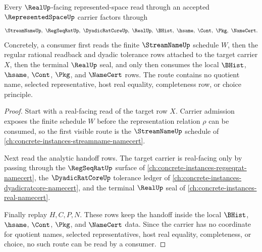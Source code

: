 \begin{theorem}
\label{thm:representedspace-streamname-real-handoff}
Every $\RealUp$-facing represented-space read through an accepted
$\RepresentedSpaceUp$ carrier factors through
$$
\StreamNameUp,\ \RegSeqRatUp,\ \DyadicRatCoreUp,\ \RealUp,\ \BHist,\ \hsame,\ \Cont,\ \Pkg,\ \NameCert .
$$
Concretely, a consumer first reads the finite $\StreamNameUp$ schedule $W$, then
the regular rational readback and dyadic tolerance rows attached to the target
carrier $X$, then the terminal $\RealUp$ seal, and only then consumes the local
$\BHist$, $\hsame$, $\Cont$, $\Pkg$, and $\NameCert$ rows. The route contains no
quotient name, selected representative, host real equality, completeness row, or
choice principle.
\end{theorem}
\begin{proof}
Start with a real-facing read of the target row $X$. Carrier admission exposes
the finite schedule $W$ before the representation relation $\rho$ can be
consumed, so the first visible route is the $\StreamNameUp$ schedule of
\autoref{ch:concrete-instances-streamname-namecert}.

Next read the analytic handoff rows. The target carrier is real-facing only by
passing through the $\RegSeqRatUp$ surface of
\autoref{ch:concrete-instances-regseqrat-namecert}, the $\DyadicRatCoreUp$
tolerance ledger of \autoref{ch:concrete-instances-dyadicratcore-namecert}, and
the terminal $\RealUp$ seal of \autoref{ch:concrete-instances-real-namecert}.

Finally replay $H,C,P,N$. These rows keep the handoff inside the local
$\BHist$, $\hsame$, $\Cont$, $\Pkg$, and $\NameCert$ data. Since the carrier has
no coordinate for quotient names, selected representatives, host real equality,
completeness, or choice, no such route can be read by a consumer.
\end{proof}

